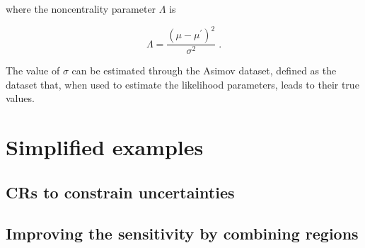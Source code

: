\noindent where the noncentrality parameter $\Lambda$ is

\begin{equation}
\label{eq:stat:noncentrality}
\Lambda = \frac{(\mu - \mu^{\prime})^2}{\sigma^2} \; .
\end{equation}

The value of $\sigma$ can be estimated through the Asimov dataset, defined as the dataset that, when used to estimate the likelihood parameters, leads to their true values.

\section{Simplified examples}
\label{sec:stat:examples}

\subsection{CRs to constrain uncertainties}
\label{sec:example_cr}

\subsection{Improving the sensitivity by combining regions}
\label{sec:example_combi}

